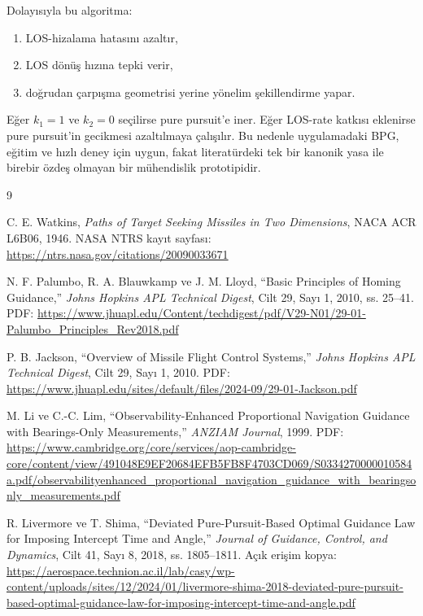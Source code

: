 \documentclass[11pt,a4paper]{article}
\begin{document}
Dolayısıyla bu algoritma:
\begin{enumerate}[leftmargin=1.2cm]
  \item LOS-hizalama hatasını azaltır,
  \item LOS dönüş hızına tepki verir,
  \item doğrudan çarpışma geometrisi yerine yönelim şekillendirme yapar.
\end{enumerate}

Eğer \(k_1 = 1\) ve \(k_2 = 0\) seçilirse pure pursuit'e iner. Eğer LOS-rate katkısı eklenirse pure pursuit'in gecikmesi azaltılmaya çalışılır. Bu nedenle uygulamadaki BPG, eğitim ve hızlı deney için uygun, fakat literatürdeki tek bir kanonik yasa ile birebir özdeş olmayan bir mühendislik prototipidir.

\begin{thebibliography}{9}

C. E. Watkins,
\newblock \emph{Paths of Target Seeking Missiles in Two Dimensions},
\newblock NACA ACR L6B06, 1946.
\newblock NASA NTRS kayıt sayfası:
\newblock \url{https://ntrs.nasa.gov/citations/20090033671}

N. F. Palumbo, R. A. Blauwkamp ve J. M. Lloyd,
\newblock ``Basic Principles of Homing Guidance,''
\newblock \emph{Johns Hopkins APL Technical Digest}, Cilt 29, Sayı 1, 2010, ss. 25--41.
\newblock PDF:
\newblock \url{https://www.jhuapl.edu/Content/techdigest/pdf/V29-N01/29-01-Palumbo_Principles_Rev2018.pdf}

P. B. Jackson,
\newblock ``Overview of Missile Flight Control Systems,''
\newblock \emph{Johns Hopkins APL Technical Digest}, Cilt 29, Sayı 1, 2010.
\newblock PDF:
\newblock \url{https://www.jhuapl.edu/sites/default/files/2024-09/29-01-Jackson.pdf}

M. Li ve C.-C. Lim,
\newblock ``Observability-Enhanced Proportional Navigation Guidance with Bearings-Only Measurements,''
\newblock \emph{ANZIAM Journal}, 1999.
\newblock PDF:
\newblock \url{https://www.cambridge.org/core/services/aop-cambridge-core/content/view/491048E9EF20684EFB5FB8F4703CD069/S0334270000010584a.pdf/observabilityenhanced_proportional_navigation_guidance_with_bearingsonly_measurements.pdf}

R. Livermore ve T. Shima,
\newblock ``Deviated Pure-Pursuit-Based Optimal Guidance Law for Imposing Intercept Time and Angle,''
\newblock \emph{Journal of Guidance, Control, and Dynamics}, Cilt 41, Sayı 8, 2018, ss. 1805--1811.
\newblock Açık erişim kopya:
\newblock \url{https://aerospace.technion.ac.il/lab/casy/wp-content/uploads/sites/12/2024/01/livermore-shima-2018-deviated-pure-pursuit-based-optimal-guidance-law-for-imposing-intercept-time-and-angle.pdf}

\end{thebibliography}
\end{document}
